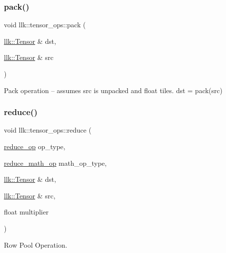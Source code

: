 \subsubsection{\texorpdfstring{pack()}{pack()}}
{\footnotesize\ttfamily void llk\+::tensor\+\_\+ops\+::pack (\begin{DoxyParamCaption}\item[{\hyperlink{classllk_1_1Tensor}{llk\+::\+Tensor} \&}]{dst,  }\item[{\hyperlink{classllk_1_1Tensor}{llk\+::\+Tensor} \&}]{src }\end{DoxyParamCaption})}



Pack operation -- assumes src is unpacked and float tiles. dst = pack(src) 

\mbox{\label{namespacellk_1_1tensor__ops_a4804848e756700934cfe20be8565265c}} 
\subsubsection{\texorpdfstring{reduce()}{reduce()}}
{\footnotesize\ttfamily void llk\+::tensor\+\_\+ops\+::reduce (\begin{DoxyParamCaption}\item[{\hyperlink{namespacellk_1_1tensor__ops_a57720b85adbe1e9b3bbab02b985f0d8d}{reduce\+\_\+op}}]{op\+\_\+type,  }\item[{\hyperlink{namespacellk_1_1tensor__ops_abbf479560e4c31bec0b83feb6531552c}{reduce\+\_\+math\+\_\+op}}]{math\+\_\+op\+\_\+type,  }\item[{\hyperlink{classllk_1_1Tensor}{llk\+::\+Tensor} \&}]{dst,  }\item[{\hyperlink{classllk_1_1Tensor}{llk\+::\+Tensor} \&}]{src,  }\item[{float}]{multiplier }\end{DoxyParamCaption})}



Row Pool Operation. 

\mbox{\label{namespacellk_1_1tensor__ops_a9727143b8fd7719345cbfd05a3fafb35}} 
